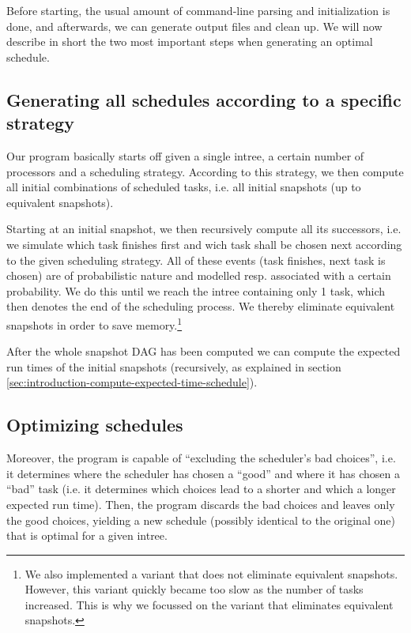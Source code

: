 Before starting, the usual amount of command-line parsing and initialization is done, and afterwards, we can generate output files and clean up. We will now describe in short the two most important steps when generating an optimal schedule.

\subsection{Generating all schedules according to a specific strategy}
\label{sec:implementation-core-generate-schedules}

Our program basically starts off given a single intree, a certain number of processors and a scheduling strategy. According to this strategy, we then compute all initial combinations of scheduled tasks, i.e. all initial snapshots (up to equivalent snapshots).

Starting at an initial snapshot, we then recursively compute all its successors, i.e. we simulate which task finishes first and wich task shall be chosen next according to the given scheduling strategy. All of these events (task finishes, next task is chosen) are of probabilistic nature and modelled resp. associated with a certain probability. We do this until we reach the intree containing only 1 task, which then denotes the end of the scheduling process. We thereby eliminate equivalent snapshots in order to save memory.\footnote{We also implemented a variant that does not eliminate equivalent snapshots. However, this variant quickly became too slow as the number of tasks increased. This is why we focussed on the variant that eliminates equivalent snapshots.}

After the whole snapshot DAG has been computed we can compute the expected run times of the initial snapshots (recursively, as explained in section \ref{sec:introduction-compute-expected-time-schedule}).

\subsection{Optimizing schedules}
\label{sec:implementation-core-optimizing-schedules}

Moreover, the program is capable of ``excluding the scheduler's bad choices'', i.e. it determines where the scheduler has chosen a ``good'' and where it has chosen a ``bad'' task (i.e. it determines which choices lead to a shorter and which a longer expected run time). Then, the program discards the bad choices and leaves only the good choices, yielding a new schedule (possibly identical to the original one) that is optimal for a given intree.

